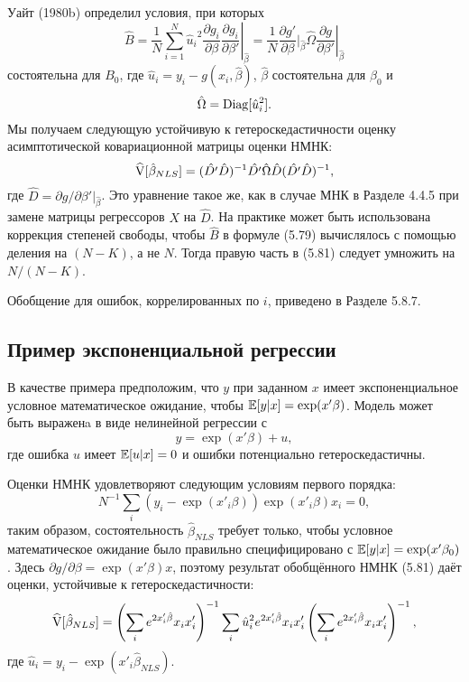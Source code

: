 Уайт (1980b) определил условия, при которых
\begin{equation}
\hat{B}= \left. \frac{1}{N} \sum_{i=1}^{N} {\hat{u}_i}^{2} \frac{\partial g_i}{\partial \beta} \frac{\partial g_i}{\partial \beta'}\right|_{\hat{\beta}}= \left. \frac{1}{N}  \frac{\partial g'}{\partial \beta}|_{\hat{\beta}} \hat{\Omega} \frac{\partial g}{\partial \beta'}\right|_{\hat{\beta}} 
\end{equation}
состоятельна для $B_0$, где $\hat{u}_{i}=y_i-g(x_i,\hat{\beta})$, $\hat{\beta}$ состоятельна для $\beta_0$ и
\begin{equation}
\hat{\Omega}=\mathrm{Diag}[{\hat{u}_i}^{2}].
\end{equation}
Мы получаем следующую устойчивую к гетероскедастичности оценку асимптотической ковариационной матрицы оценки НМНК:
\begin{equation}
\widehat{\mathrm{V}}[\hat{\beta}_{NLS}]=(\hat{D'}\hat{D})^{-1} \hat{D'} \hat{\Omega} \hat{D} (\hat{D'}\hat{D})^{-1},
\end{equation}
где $\hat{D}=\partial g/ \partial \beta'|_{\hat{\beta}}$. Это уравнение такое же, как в случае МНК в Разделе 4.4.5 при замене матрицы регрессоров $X$ на $\hat{D}$. На практике может быть использована коррекция степеней свободы, чтобы $\hat{B}$ в формуле (5.79) вычислялось с помощью деления на $(N-K)$, а не $N$. Тогда правую часть в (5.81) следует умножить на $N/(N-K)$.

Обобщение для ошибок, коррелированных по $i$, приведено в Разделе 5.8.7.

\subsection{Пример экспоненциальной регрессии}

В качестве примера предположим, что $y$ при заданном $x$ имеет экспоненциальное условное математическое ожидание, чтобы $\mathbb{E}[y|x]=\exp(x'\beta)$. Модель может быть выраженa в виде нелинейной регрессии с
\[
y=\exp(x'\beta)+u,
\]
где ошибка $u$ имеет $\mathbb{E}[u|x]=0$ и ошибки потенциально гетероскедастичны.

Оценки НМНК удовлетворяют следующим условиям первого порядка:
\begin{equation}
N^{-1} \sum_i (y_i-\exp(x'_i\beta))\exp(x'_i\beta)x_i=0,
\end{equation}
таким образом, состоятельность $\hat{\beta}_{NLS}$ требует только, чтобы условное математическое ожидание было правильно специфицировано с $\mathbb{E}[y|x]=\exp(x'\beta_0)$. Здесь $\partial g/ \partial \beta = \exp(x'\beta)x$, поэтому результат обобщённого НМНК (5.81) даёт оценки, устойчивые к гетероскедастичности:
\begin{equation}
\widehat{\mathrm{V}}[\hat{\beta}_{NLS}]=\left( \sum_i e^{2 x'_i \hat{\beta}} x_i x'_i \right) ^{-1} \sum_i {\hat{u}_i}^{2} e^{2 x'_i \hat{\beta}} x_i x'_i \left( \sum_i e^{2 x'_i \hat{\beta}} x_i x'_i \right) ^{-1},
\end{equation}
где $\hat{u}_i=y_i-\exp(x'_i \hat{\beta}_{NLS})$.

